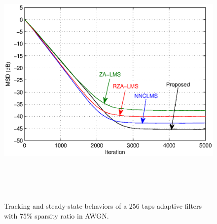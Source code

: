 \begin{figure}[!htb]
\begin{center}
\vspace{1cm}
\includegraphics[width=16.5cm, height=12cm]{Figures/Chapter5/fig10.eps}\\
\end{center}
\vspace{-1cm}
\caption{Tracking and steady-state behaviors of a 256 taps adaptive filters with 75\% sparsity ratio in AWGN.}
\label{fig8}
\vspace{1.5cm}
\end{figure}

